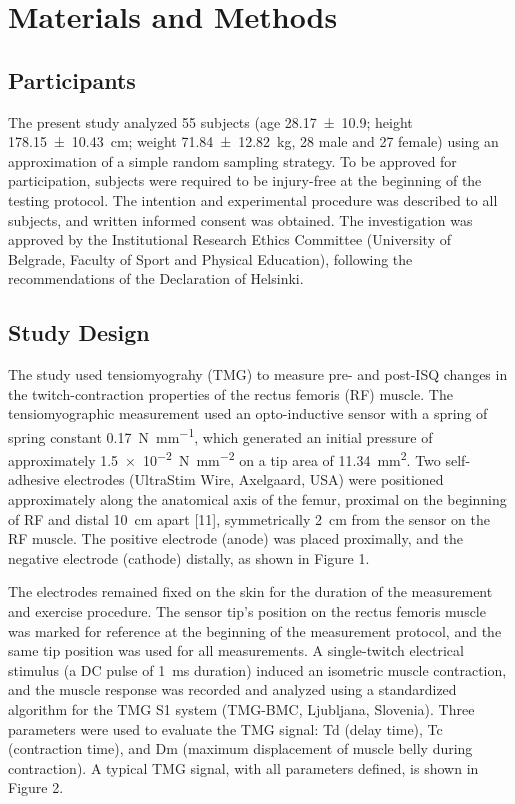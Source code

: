 \documentclass[utf8]{style/FrontiersinHarvard}
\begin{document}
\section{Materials and Methods}
\subsection{Participants}
The present study analyzed 55 subjects (age \SI{28.17 \pm 10.9}{\year}; height \SI{178.15 \pm 10.43}{\centi \meter}; weight \SI{71.84 \pm 12.82}{\kilogram}, 28 male and 27 female) using an approximation of a simple random sampling strategy.
To be approved for participation, subjects were required to be injury-free at the beginning of the testing protocol.
The intention and experimental procedure was described to all subjects, and written informed consent was obtained.
The investigation was approved by the Institutional Research Ethics Committee (University of Belgrade, Faculty of Sport and Physical Education), following the recommendations of the Declaration of Helsinki.

\subsection{Study Design}
The study used tensiomyograhy (TMG) to measure pre- and post-ISQ changes in the twitch-contraction properties of the rectus femoris (RF) muscle.
The tensiomyographic measurement used an opto-inductive sensor with a spring of spring constant \SI{0.17}{\newton \per \milli \meter}, which generated an initial pressure of approximately \SI{1.5e-2}{\newton \per \milli \meter \squared} on a tip area of \SI{11.34}{\milli \meter \squared}.
Two self-adhesive electrodes (UltraStim\textregistered{} Wire, Axelgaard, USA) were positioned approximately along the anatomical axis of the femur, proximal on the beginning of RF and distal \SI{10}{\centi \meter} apart [11], symmetrically \SI{2}{\centi \meter} from the sensor on the RF muscle.
The positive electrode (anode) was placed proximally, and the negative electrode (cathode) distally, as shown in Figure 1.

The electrodes remained fixed on the skin for the duration of the measurement and exercise procedure.
The sensor tip's position on the rectus femoris muscle was marked for reference at the beginning of the measurement protocol, and the same tip position was used for all measurements.
A single-twitch electrical stimulus (a DC pulse of \SI{1}{\milli \second} duration) induced an isometric muscle contraction,
and the muscle response was recorded and analyzed using a standardized algorithm for the TMG S1 system (TMG-BMC, Ljubljana, Slovenia).
Three parameters were used to evaluate the TMG signal:
Td (delay time), Tc (contraction time), and Dm (maximum displacement of muscle belly during contraction).
A typical TMG signal, with all parameters defined, is shown in Figure 2.
\end{document}
